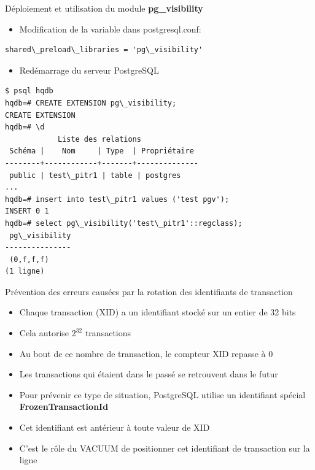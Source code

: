 \begin{frame}[fragile]{Déploiement et utilisation du module \textbf{pg\_visibility}}

\begin{itemize}
   \item Modification de la variable dans postgresql.conf:
\end{itemize}

\begin{tiny}
\begin{Verbatim}[commandchars=\&\{\}]
   shared\_preload\_libraries = 'pg\_visibility'
\end{Verbatim}
\end{tiny}

\begin{itemize}
   \item Redémarrage du serveur PostgreSQL
\end{itemize}

\begin{tiny}
\begin{Verbatim}[commandchars=\&\{\}]
$ psql hqdb
hqdb=# CREATE EXTENSION pg\_visibility;
CREATE EXTENSION
hqdb=# \d
            Liste des relations
 Schéma |    Nom     | Type  | Propriétaire
--------+------------+-------+--------------
 public | test\_pitr1 | table | postgres
...
hqdb=# insert into test\_pitr1 values ('test pgv');
INSERT 0 1                                           
hqdb=# select pg\_visibility('test\_pitr1'::regclass);
 pg\_visibility                                                 
---------------                     
 (0,f,f,f)                                      
(1 ligne)     
\end{Verbatim}
\end{tiny}

\end{frame}


\begin{frame}{Prévention des erreurs causées par la rotation des identifiants de transaction}

\begin{itemize}
   \item Chaque transaction (XID) a un identifiant stocké sur un entier de 32 bits
   \item Cela autorise $2^{32}$ transactions
   \item Au bout de ce nombre de transaction, le compteur XID repasse à 0
   \item Les transactions qui étaient dans le passé se retrouvent dans le futur
   \item Pour prévenir ce type de situation, PostgreSQL utilise un identifiant spécial \textbf{FrozenTransactionId}
   \item Cet identifiant est antérieur à toute valeur de XID
   \item C'est le rôle du VACUUM de positionner cet identifiant de transaction sur la ligne
\end{itemize}

\end{frame}

